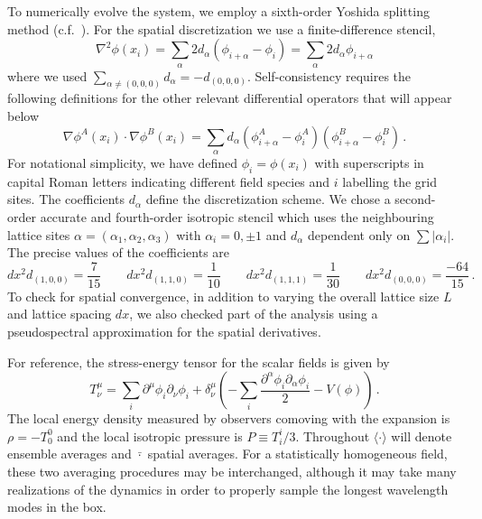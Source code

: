\documentclass[11pt,a4paper]{article}
\begin{document}
To numerically evolve the system, we employ a sixth-order Yoshida splitting method (c.f.~\cite{Yoshida:1990,Huang:2011gf,Sainio:2012mw}).
For the spatial discretization we use a finite-difference stencil,
\begin{equation}
  \nabla^2 \phi(x_i) = \sum_\alpha 2d_\alpha(\phi_{i+\alpha}-\phi_i) = \sum_\alpha 2d_\alpha\phi_{i+\alpha}
\end{equation}
where we used $\sum_{\alpha \neq (0,0,0)} d_\alpha = -d_{(0,0,0)}$.
Self-consistency requires the following definitions for the other relevant differential operators that will appear below
\begin{equation}
  \nabla \phi^A(x_i) \cdot \nabla \phi^B(x_i) = \sum_\alpha d_\alpha\left(\phi^A_{i+\alpha}-\phi^A_i\right)\left(\phi^B_{i+\alpha}-\phi^B_{i}\right) \, .
\end{equation}
For notational simplicity, we have defined $\phi_i = \phi(x_i)$ with superscripts in capital Roman letters indicating different field species and $i$ labelling the grid sites.
The coefficients $d_\alpha$ define the discretization scheme.
We chose a second-order accurate and fourth-order isotropic stencil which uses the neighbouring lattice sites $\alpha = (\alpha_1,\alpha_2,\alpha_3)$ with $\alpha_i = 0,\pm 1$ and $d_\alpha$ dependent only on $\sum |\alpha_i|$.
The precise values of the coefficients are
\begin{equation}
  dx^2 d_{(1,0,0)} = \frac{7}{15} \qquad
  dx^2 d_{(1,1,0)} = \frac{1}{10} \qquad
  dx^2 d_{(1,1,1)} = \frac{1}{30} \qquad
  dx^2 d_{(0,0,0)} = \frac{-64}{15} \, .
\end{equation}
To check for spatial convergence, in addition to varying the overall lattice size $L$ and lattice spacing $dx$,
we also checked part of the analysis using a pseudospectral approximation for the spatial derivatives.

For reference, the stress-energy tensor for the scalar fields is given by
\begin{equation}
  T^{\mu}_{\nu} = \sum_i\partial^\mu\phi_i\partial_\nu\phi_i + \delta^\mu_\nu\left(-\sum_i\frac{\partial^\alpha\phi_i\partial_\alpha\phi_i}{2} - V(\phi) \right) \, .
\end{equation} 
The local energy density measured by observers comoving with the expansion is $\rho = -T^{0}_0$ and the local isotropic pressure is $P \equiv T^i_i/3$.
Throughout $\langle\cdot\rangle$ will denote ensemble averages and $\bar{\cdot}$ spatial averages.
For a statistically homogeneous field, these two averaging procedures may be interchanged, although it may take many realizations of the dynamics in order to properly sample the longest wavelength modes in the box.
\end{document}
